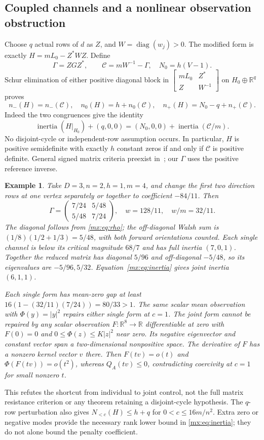\documentclass[11pt]{article}
\newcommand{\R}{\mathbb R}
\newtheorem{matrixExample}[theorem]{Example}
\providecommand{\Nlow}{N_{<c}}
\providecommand{\diag}{\operatorname{diag}}
\begin{document}
\subsection{Coupled channels and a nonlinear observation obstruction}
Choose $q$ actual rows of $d$ as $Z$, and $W=\diag(w_j)>0$. The modified
form is exactly $H=mL_0-Z^*WZ$. Define
\[
 \Gamma=ZGZ^*,\qquad \mathcal C=mW^{-1}-\Gamma,\quad N_0=h(V-1).
\]
Schur elimination of either positive diagonal block in
$\left[\begin{smallmatrix}mL_0&Z^*\\Z&W^{-1}\end{smallmatrix}\right]$
on $H_0\oplus\R^q$ proves
\begin{equation}\label{mx:eq:inertia}
 n_-(H)=n_-(\mathcal C),\quad n_0(H)=h+n_0(\mathcal C),\quad
 n_+(H)=N_0-q+n_+(\mathcal C).
\end{equation}
Indeed the two congruences give the identity
\[
 \operatorname{inertia}(H|_{H_0})+(q,0,0)
 = (N_0,0,0)+\operatorname{inertia}(\mathcal C/m).
\]
No disjoint-cycle or independent-row assumption occurs. In particular,
$H$ is positive semidefinite with exactly $h$ constant zeros if and only if
$\mathcal C$ is positive definite. General signed matrix criteria preexist
in~\cite{mx:Chen}; our $\Gamma$ uses the positive reference inverse.

\begin{matrixExample}\label{mx:ex:coupled}
Take $D=3,n=2,h=1,m=4$, and change the first two direction rows at one
vertex separately or together to coefficient $-84/11$. Then
\[
 \Gamma=\begin{pmatrix}7/24&5/48\\5/48&7/24\end{pmatrix},
 \quad w=128/11,\quad w/m=32/11.
\]
The diagonal follows from \eqref{mx:eq:rho}; the off-diagonal Walsh sum is
$(1/8)(1/2+1/3)=5/48$, with both forward orientations counted.
Each single channel is below its critical magnitude $68/7$ and has full
inertia $(7,0,1)$. Together the reduced matrix has diagonal $5/96$ and
off-diagonal $-5/48$, so its eigenvalues are $-5/96,5/32$.
Equation~\eqref{mx:eq:inertia} gives joint inertia $(6,1,1)$.

Each single form has mean-zero gap at least
$16(1-(32/11)(7/24))=80/33>1$. The same scalar mean observation with
$\Phi(y)=|y|^2$ repairs either single form at $c=1$. The joint form cannot
be repaired by any scalar observation $F:\R^8\to\R$ differentiable at zero
with $F(0)=0$ and $0\leq\Phi(z)\leq K|z|^2$ near zero. Its negative
eigenvector and constant vector span a two-dimensional nonpositive space.
The derivative of $F$ has a nonzero kernel vector $v$ there. Then
$F(tv)=o(t)$ and $\Phi(F(tv))=o(t^2)$, whereas $Q_A(tv)\leq0$, contradicting
coercivity at $c=1$ for small nonzero $t$.
\end{matrixExample}
This refutes the shortcut from individual to joint control, not the full
matrix resistance criterion or any theorem retaining a disjoint-cycle
hypothesis. The $q$-row perturbation also gives
$\Nlow(H)\leq h+q$ for $0<c\leq16m/n^2$. Extra zero or negative modes
provide the necessary rank lower bound in \eqref{mx:eq:inertia}; they do not
alone bound the penalty coefficient.
\end{document}

